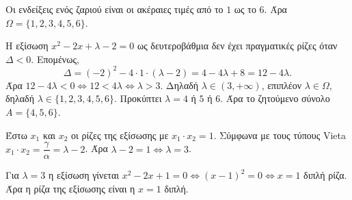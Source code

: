 
\begin{alist}
\item Οι ενδείξεις ενός ζαριού είναι οι ακέραιες τιμές από το $1$ ως το $6$.
Άρα $\Omega = \{1, 2, 3, 4, 5, 6\}$.

\item 
\begin{rlist}
\item Η εξίσωση $x^2 - 2x + \lambda - 2 = 0$ ως δευτεροβάθμια δεν έχει πραγματικές ρίζες όταν $\Delta < 0$.
Επομένως,
\[\Delta = (-2)^2 - 4 \cdot 1 \cdot (\lambda - 2) = 4 - 4\lambda + 8 = 12 - 4\lambda.\]
Άρα $12 - 4\lambda < 0 \Leftrightarrow 12 < 4\lambda \Leftrightarrow \lambda > 3$.
Δηλαδή $\lambda \in (3, +\infty)$, επιπλέον $\lambda \in \Omega$, δηλαδή $\lambda \in \{1, 2, 3, 4, 5, 6\}$.
Προκύπτει $\lambda = 4$ ή $5$ ή $6$.
Άρα το ζητούμενο σύνολο $A = \{4, 5, 6\}$.

\item Έστω $x_1$ και $x_2$ οι ρίζες της εξίσωσης με $x_1 \cdot x_2 = 1$.
Σύμφωνα με τους τύπους Vieta $x_1 \cdot x_2 = \dfrac{\gamma}{\alpha} = \lambda - 2$.
Άρα $\lambda - 2 = 1 \Leftrightarrow \lambda = 3$.
\end{rlist}

\item Για $\lambda = 3$ η εξίσωση γίνεται $x^2 - 2x + 1 = 0 \Leftrightarrow (x - 1)^2 = 0 \Leftrightarrow x = 1$ διπλή ρίζα.
Άρα η ρίζα της εξίσωσης είναι η $x = 1$ διπλή.
\end{alist}

